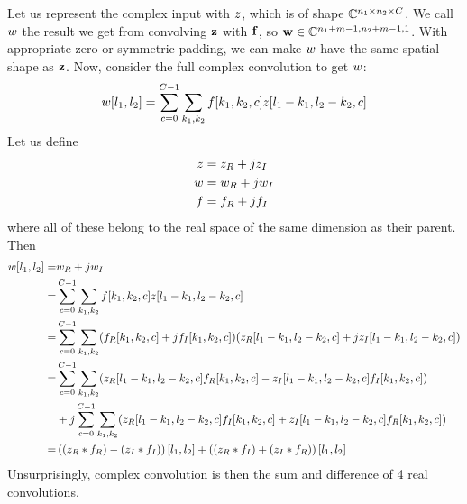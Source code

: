 Let us represent the complex input with $\SigIn$, which is of shape
$\complexes[n_1\x n_2\x C]$. We call $\SigOut$ the result we get from convolving
$\SigInB$ with $\FilterB$, so $\SigOutB \in \complexes[n_1 + m - 1, n_2 + m -1, 1]$. With
appropriate zero or symmetric padding, we can make $\SigOut$ have the same
spatial shape as $\SigInB$. Now, consider the full complex convolution to get
$\SigOut$:
\begin{equation}
 \SigOut[l_1,l_2] = \sum_{c=0}^{C-1} \sum_{k_1,k_2} \Filter[k_1,k_2,c] \SigIn[l_1-k_1,l_2-k_2,c]
\end{equation}
Let us define 
\begin{align}
  \SigIn & =  \SigIn_R +j\SigIn_I \\
  \SigOut & =  \SigOut_R +j\SigOut_I \\
  \Filter & =  \Filter_R + j\Filter_I
\end{align}
where all of these belong to the real space of the same dimension as their
parent. Then
\begin{align}
  \SigOut[l_1, l_2]  =&  \SigOut_R +j\SigOut_I \nonumber\\
  = & \sum_{c=0}^{C-1} \sum_{k_1,k_2} \Filter[k_1,k_2,c] \SigIn[l_1-k_1,l_2-k_2,c] \nonumber\\
  =& \sum_{c=0}^{C-1} \sum_{k_1,k_2} (\Filter_R[k_1,k_2,c] +j\Filter_I[k_1,k_2,c]) 
        (\SigIn_R[l_1-k_1,l_2-k_2,c]+ j\SigIn_I[l_1-k_1,l_2-k_2,c]) \nonumber \\
        =&  \sum_{c=0}^{C-1} \sum_{k_1,k_2} (
          \SigIn_R[l_1-k_1,l_2-k_2,c] \Filter_R[k_1,k_2,c] - 
          \SigIn_I[l_1-k_1,l_2-k_2,c] \Filter_I[k_1,k_2,c]) \nonumber \\
          &+ j\sum_{c=0}^{C-1} \sum_{k_1,k_2} (\SigIn_R[l_1-k_1,l_2-k_2,c] \Filter_I[k_1,k_2,c] + 
          \SigIn_I[l_1-k_1,l_2-k_2,c] \Filter_R[k_1,k_2,c]) \nonumber\\
          =& \left((\SigIn_R \ast \Filter_R) - (\SigIn_I \ast \Filter_I)\right)[l_1,l_2] + 
          \left((\SigIn_R \ast \Filter_I) + (\SigIn_I \ast \Filter_R)\right)[l_1,l_2]
\end{align}
Unsurprisingly, complex convolution is then the sum and difference of 4 real convolutions.

  
